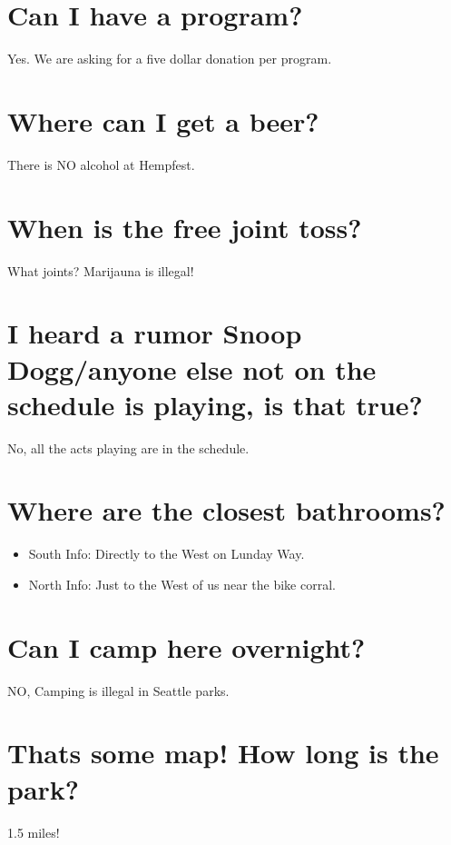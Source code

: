 \section{Can I have a program?}
Yes. We are asking for a five dollar donation per program. 

\section{Where can I get a beer?}
There is NO alcohol at Hempfest. 

\section{When is the free joint toss?}
What joints? Marijauna is illegal! 

\section{I heard a rumor Snoop Dogg/anyone else not on the schedule is playing, is that true?}
No, all the acts playing are in the schedule.

\section{Where are the closest bathrooms?}
\begin{itemize}
	\item South Info: Directly to the West on Lunday Way.
	\item North Info: Just to the West of us near the bike corral.
\end {itemize}

 
\section{Can I camp here overnight?}
NO, Camping is illegal in Seattle parks.

\section{Thats some map! How long is the park?}
1.5 miles! 

